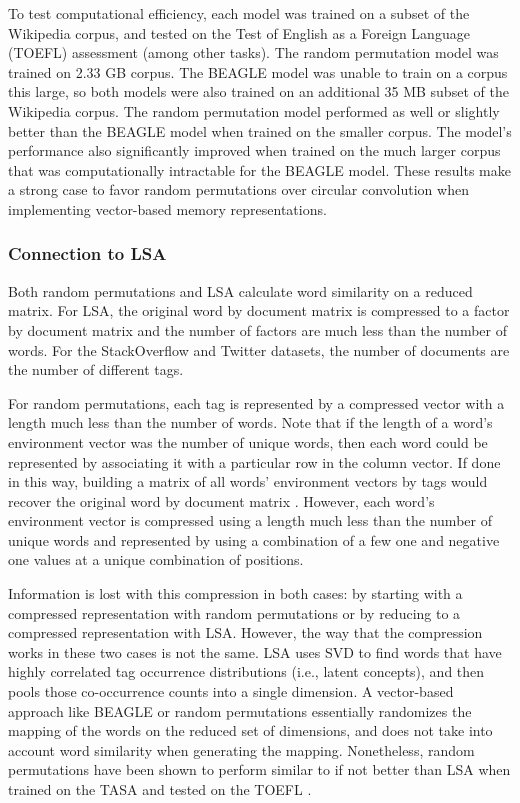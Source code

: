 \documentclass[man,floatsintext,donotrepeattitle]{apa6}
\begin{document}
To test computational efficiency, each model was trained on a subset of the Wikipedia corpus, and tested on the Test of English as a Foreign Language (TOEFL) assessment (among other tasks).
The random permutation model was trained on \num{2.33} GB corpus.
The BEAGLE model was unable to train on a corpus this large, so both models were also trained on an additional \num{35} MB subset of the Wikipedia corpus.
The random permutation model performed as well or slightly better than the BEAGLE model when trained on the smaller corpus.
The model's performance also significantly improved when trained on the much larger corpus that was computationally intractable for the BEAGLE model.
These results make a strong case to favor random permutations over circular convolution when implementing vector-based memory representations.

\subsubsection{Connection to LSA}

Both random permutations and LSA calculate word similarity on a reduced matrix.
For LSA, the original word by document matrix is compressed to a factor by document matrix and the number of factors are much less than the number of words.
For the StackOverflow and Twitter datasets, the number of documents are the number of different tags.

For random permutations, each tag is represented by a compressed vector with a length much less than the number of words.
Note that if the length of a word's environment vector was the number of unique words, then each word could be represented by associating it with a particular row in the column vector.
If done in this way, building a matrix of all words' environment vectors by tags would recover the original word by document matrix \parencite{Kanerva2000}.
However, each word's environment vector is compressed using a length much less than the number of unique words and represented by using a combination of a few one and negative one values at a unique combination of positions. 

Information is lost with this compression in both cases: by starting with a compressed representation with random permutations or by reducing to a compressed representation with LSA.
However, the way that the compression works in these two cases is not the same.
LSA uses SVD to find words that have highly correlated tag occurrence distributions (i.e., latent concepts), and then pools those co-occurrence counts into a single dimension.
A vector-based approach like BEAGLE or random permutations essentially randomizes the mapping of the words on the reduced set of dimensions, and does not take into account word similarity when generating the mapping.
Nonetheless, random permutations have been shown to perform similar to if not better than LSA when trained on the TASA and tested on the TOEFL \parencites{Sahlgren2008,Jones2007}.
\end{document}
